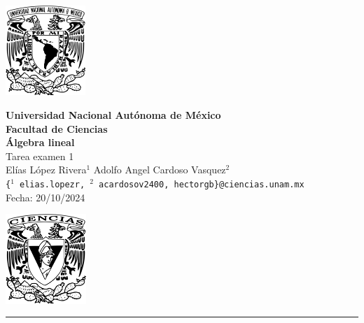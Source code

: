\documentclass[11pt,letterpaper]{article}
\begin{document}

\begin{center}
    \begin{minipage}{3cm}
    	\begin{center}
    		\includegraphics[height=3.4cm]{logo_unam.png}
    	\end{center}
    \end{minipage}\hfill
    \begin{minipage}{10cm}
    	\begin{center}
    	\textbf{\large Universidad Nacional Autónoma de México}\\[0.1cm]
        \textbf{Facultad de Ciencias}\\[0.1cm]
        \textbf{\'Algebra lineal}\\[0.1cm]
        Tarea examen 1 \\[0.1cm]
         El\'ias L\'opez Rivera$^{1}$\,\,Adolfo Angel Cardoso Vasquez$^{2}$\\[0.1cm]
    
        \texttt{\{$^{1}$ elias.lopezr,\,${^2}$ acardosov2400,\,hectorgb\}@ciencias.unam.mx }\\[0.1cm]
        Fecha:\,\,20/10/2024
    	\end{center}
    \end{minipage}\hfill
    \begin{minipage}{3cm}
    	\begin{center}
    		\includegraphics[height=3.4cm]{Logo_FC.png}
    	\end{center}
    \end{minipage}
\end{center}

\rule{17cm}{0.1mm}
\end{document}

